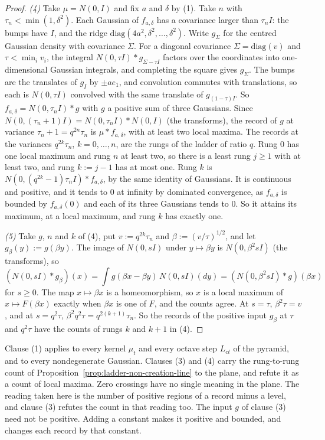 \begin{proof}
\emph{(4)} Take $\mu = N(0, I)$ and fix $a$ and $\delta$ by (1). Take $n$ with
$\tau_n < \min(1, \delta^2)$. Each Gaussian of $f_{a,\delta}$ has a covariance larger than
$\tau_nI$: the bumps have $I$, and the ridge $\mathrm{diag}(4a^2, \delta^2, \dots, \delta^2)$. Write $g_\Sigma$ for the centred Gaussian density with covariance $\Sigma$. For a diagonal covariance $\Sigma = \mathrm{diag}(v)$ and $\tau < \min_iv_i$, the integral
$N(0, \tau I) * g_{\Sigma - \tau I}$ factors over the coordinates into one-dimensional Gaussian
integrals, and completing the square gives $g_\Sigma$. The bumps are the translates of $g_I$ by
$\pm ae_1$, and convolution commutes with translations, so each is $N(0, \tau I)$ convolved with
the same translate of $g_{(1 - \tau)I}$. So
$f_{a,\delta} = N(0, \tau_nI) * g$ with $g$ a positive sum of three Gaussians. Since
$N(0, (\tau_n + 1)I) = N(0, \tau_nI) * N(0, I)$ (the transforms), the record of $g$ at
variance $\tau_n + 1 = q^{2n}\tau_n$ is $\mu * f_{a,\delta}$, with at least two local maxima. The
records at the variances $q^{2k}\tau_n$, $k = 0, \dots, n$, are the rungs of the ladder of ratio
$q$.
Rung $0$ has one local maximum and rung $n$ at least two, so there is a least rung $j \ge 1$ with
at least two, and rung $k := j - 1$ has at most one. Rung $k$ is
$N(0, (q^{2k} - 1)\tau_nI) * f_{a,\delta}$, by the same identity of Gaussians. It is continuous and
positive, and it tends to $0$ at infinity by dominated convergence, as $f_{a,\delta}$ is bounded by
$f_{a,\delta}(0)$ and each of its three Gaussians tends to $0$. So it attains its
maximum, at a local maximum, and rung $k$ has exactly one.

\emph{(5)} Take $g$, $n$ and $k$ of (4), put $v := q^{2k}\tau_n$ and $\beta := (v/\tau)^{1/2}$, and
let $g_\beta(y) := g(\beta y)$. The image of $N(0, sI)$ under $y \mapsto \beta y$ is $N(0, \beta^2sI)$ (the
transforms), so
\[
  (N(0, sI) * g_\beta)(x) = \int g(\beta x - \beta y)\,N(0, sI)(dy) = (N(0, \beta^2sI) * g)(\beta x)
\]
for $s \ge 0$. The map $x \mapsto \beta x$ is a homeomorphism, so $x$ is a local maximum of
$x \mapsto F(\beta x)$ exactly when $\beta x$ is one of $F$, and the counts agree. At $s = \tau$,
$\beta^2\tau = v$, and at $s = q^2\tau$, $\beta^2q^2\tau = q^{2(k+1)}\tau_n$. So the records of the
positive input $g_\beta$ at $\tau$ and $q^2\tau$ have the counts of rungs $k$ and $k + 1$ in (4).
\end{proof}

Clause (1) applies to every kernel $\mu_t$ and every octave step $L_{ct}$ of the \Matern{}
pyramid, and to every nondegenerate Gaussian. Clauses (3) and (4) carry the rung-to-rung count of
Proposition~\ref{prop:ladder-non-creation-line} to the plane, and refute it as a count of local
maxima. Zero crossings have no single meaning in the plane. The reading taken here is the number of
positive regions of a record minus a level, and clause (3) refutes the count in that reading too.
The input $g$ of clause (3) need not be positive. Adding a constant makes it positive and bounded,
and changes each record by that constant.

